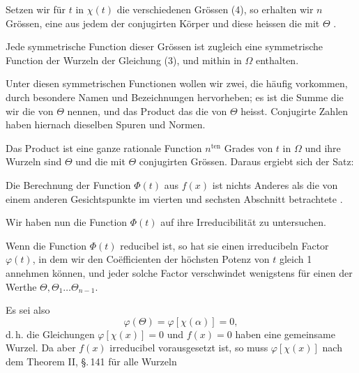 
Setzen wir für $t$ in $\chi(t)$ die verschiedenen Grössen (4), so
erhalten wir $n$ Grössen, eine aus jedem der conjugirten Körper
und diese heissen die mit $\Theta$ .

Jede symmetrische Function dieser Grössen ist zugleich eine
symmetrische Function der Wurzeln der Gleichung (3), und mithin in
$\Omega$ enthalten.

Unter diesen symmetrischen Functionen wollen wir zwei, die
häufig vorkommen, durch besondere Namen und Bezeichnungen
hervorheben; es ist die Summe
die wir die  von $\Theta$ nennen, und das Product
das die  von $\Theta$ heisst. Conjugirte Zahlen haben hiernach
dieselben Spuren und Normen.

Das Product
ist eine ganze rationale Function $n^{\mathrm{ten}}$ Grades von $t$ in
$\Omega$ und ihre Wurzeln sind $\Theta$ und die mit $\Theta$
conjugirten Grössen. Daraus ergiebt sich der Satz:


Die Berechnung der Function $\Phi(t)$ aus $f(x)$ ist nichts
Anderes als die von einem anderen Gesichtspunkte im vierten und
sechsten Abschnitt betrachtete .

Wir haben nun die Function $\Phi(t)$ auf ihre Irreducibilität zu
untersuchen.

Wenn die Function $\Phi(t)$ reducibel ist, so hat sie einen
irreducibeln Factor $\varphi(t)$, in dem wir den Co\"efficienten der
höchsten Potenz von $t$ gleich 1 annehmen können, und jeder solche
Factor verschwindet wenigstens für einen der Werthe $\Theta,
\Theta_1 \ldots \Theta_{n-1}$.

Es sei also
\[
\varphi(\Theta) = \varphi[\chi(\alpha)] = 0,
\]
d.\,h. die Gleichungen $\varphi[\chi(x)] = 0$ und $f(x) = 0$ haben
eine gemeinsame Wurzel. Da aber $f(x)$ irreducibel vorausgesetzt
ist, so muss $\varphi[\chi(x)]$ nach dem Theorem II, \S.\,141 für alle Wurzeln
